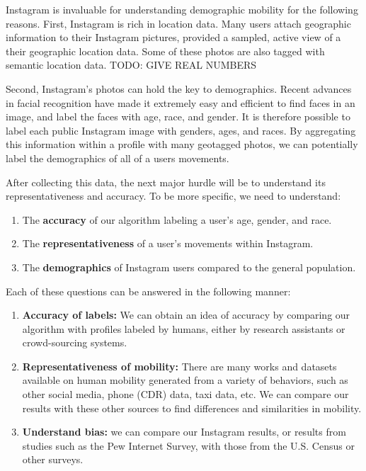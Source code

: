 \documentclass[12pt]{article}
\begin{document}
Instagram is invaluable for understanding demographic mobility for the following reasons.
First, Instagram is rich in location data.
Many users attach geographic information to their Instagram pictures, provided a sampled, active view of a their geographic location data.
Some of these photos are also tagged with semantic location data.
TODO: GIVE REAL NUMBERS

Second, Instagram's photos can hold the key to demographics.
Recent advances in facial recognition have made it extremely easy and efficient to find faces in an image, and label the faces with age, race, and gender.
It is therefore possible to label each public Instagram image with genders, ages, and races.
By aggregating this information within a profile with many geotagged photos, we can potentially label the demographics of all of a users movements.

After collecting this data, the next major hurdle will be to understand its representativeness and accuracy.
To be more specific, we need to understand:
\begin{enumerate}
  \item The \textbf{accuracy} of our algorithm labeling a user's age, gender, and race.
  \item The \textbf{representativeness} of a user's movements within Instagram. 
  \item The \textbf{demographics} of Instagram users compared to the general population.
\end{enumerate}

Each of these questions can be answered in the following manner:
\begin{enumerate}
  \item \textbf{Accuracy of labels:} We can obtain an idea of accuracy by comparing our algorithm with profiles labeled by humans, either by research assistants or crowd-sourcing systems.
  \item \textbf{Representativeness of mobility:} There are many works and datasets available on human mobility generated from a variety of behaviors, such as other social media, phone (CDR) data, taxi data, etc. We can compare our results with these other sources to find differences and similarities in mobility.
  \item \textbf{Understand bias:} we can compare our Instagram results, or results from studies such as the Pew Internet Survey, with those from the U.S. Census or other surveys.
\end{enumerate}
\end{document}
